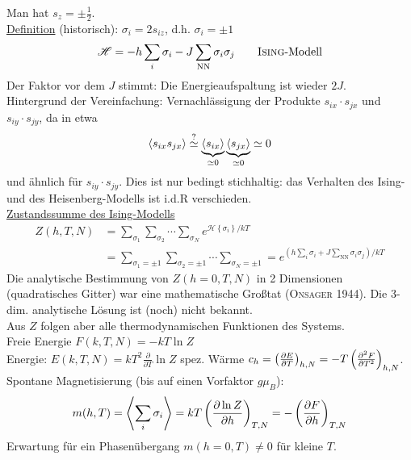 Man hat $s_z = \pm \frac{1}{2}$. \\
\underline{Definition} (historisch): $\sigma_i = 2 s_{iz}$, d.h. $\sigma_i = \pm 1$
\begin{equation}
    \mathscr{H} = - h \sum_i \sigma_i - J \sum_\text{NN} \sigma_i \sigma_j \qquad \text{\textsc{Ising}-Modell}
\end{equation}
Der Faktor vor dem $J$ stimmt: Die Energieaufspaltung ist wieder $2J$. \\
Hintergrund der Vereinfachung: Vernachlässigung der Produkte $s_{ix} \cdot s_{jx}$ und $s_{iy} \cdot s_{jy}$, da in etwa
\begin{equation}
    \left\langle s_{ix} s_{jx}\right\rangle \overset{?}{\simeq} \underbrace{\left\langle s_{ix}\right\rangle}_{\simeq 0} \underbrace{\left\langle s_{jx}\right\rangle}_{\simeq 0} \simeq 0
\end{equation}
und ähnlich für $s_{iy} \cdot s_{jy}$. Dies ist nur bedingt stichhaltig: das Verhalten des Ising- und des Heisenberg-Modells ist i.d.R verschieden.\\
\underline{Zustandssumme des Ising-Modells}
\begin{equation}
    \begin{split}
        Z(h, T, N) &= \sum_{\sigma_1} \sum_{\sigma_2} \cdots \sum_{\sigma_N} e^{\mathscr{H} \left\{ \sigma_i \right\} / k T} \\
        &= \sum_{\sigma_1 = \pm 1} \sum_{\sigma_2 = \pm 1} \cdots \sum_{\sigma_N = \pm 1} = e^{ \left( h \sum_i \sigma_i + J \sum_\text{NN} \sigma_i \sigma_j \right)/kT }
    \end{split}
\end{equation}
Die analytische Bestimmung von $Z(h=0, T, N)$ in 2 Dimensionen (quadratisches Gitter) war eine mathematische Großtat (\textsc{Onsager} 1944).
Die 3-dim. analytische Lösung ist (noch) nicht bekannt.\\
Aus $Z$ folgen aber alle thermodynamischen Funktionen des Systems. \\
Freie Energie $F(k, T, N) = - k T \ln Z$ \\
Energie: $E(k, T, N) = k T^2 \frac{\partial}{\partial T} \ln Z$
spez. Wärme $c_h = \left( \frac{\partial E}{\partial T} \right)_{h, N} = - T \left( \frac{\partial^2 F}{\partial T^2} \right)_{h, N}$. \\
Spontane Magnetisierung (bis auf einen Vorfaktor $g \mu_B$):
\begin{equation}
    m(h, T) = \left\langle\sum_i \sigma_i\right\rangle = k T \left( \frac{\partial \ln Z}{\partial h} \right)_{T, N} = - \left( \frac{\partial F}{\partial h} \right)_{T, N}
\end{equation}
Erwartung für ein Phasenübergang $m(h=0, T) \neq 0$ für kleine $T$. \\
